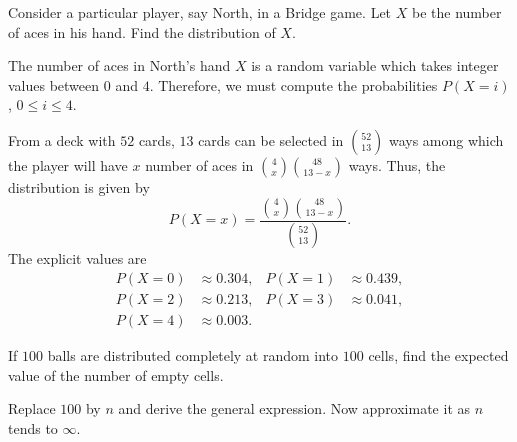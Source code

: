 \begin{problem}[Handout 1, \# 16]
  Consider a particular player, say North, in a Bridge game. Let \(X\) be
  the number of aces in his hand. Find the distribution of \(X\).
\end{problem}
\begin{solution*}
  The number of aces in North's hand \(X\) is a random variable which takes
  integer values between \(0\) and \(4\). Therefore, we must compute the
  probabilities \(P(X=i)\), \(0\leq i\leq 4\).

  From a deck with \(52\) cards, \(13\) cards can be selected in
  \(\binom{52}{13}\) ways among which the player will have \(x\) number of
  aces in \(\binom{4}{x}\binom{48}{13-x}\) ways. Thus, the distribution is
  given by
  \[
    P(X=x)=\frac{\binom{4}{x}\binom{48}{13-x}}{\binom{52}{13}}.
  \]
  The explicit values are
  \begin{align*}
    P(X=0)&\approx 0.304,
    &P(X=1)&\approx 0.439,\\
    P(X=2)&\approx 0.213,
    &P(X=3)&\approx 0.041,\\
    P(X=4)&\approx 0.003.
  \end{align*}
\end{solution*}

\begin{problem}[Handout 1, \# 20]
  If \(100\) balls are distributed completely at random into \(100\) cells,
  find the expected value of the number of empty cells.

  \noindent Replace \(100\) by \(n\) and derive the general expression. Now
  approximate it as \(n\) tends to \(\infty\).
\end{problem}
\begin{solution*}
\end{solution*}

